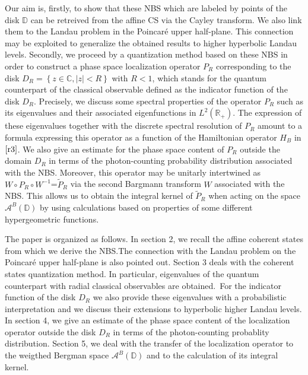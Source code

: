 Our aim is, firstly, to show that these NBS which are labeled by points of
the disk $\mathbb{D}$ can be retreived from the affine CS via the Cayley
transform. We also link them to the Landau problem in the Poincar\'{e} upper
half-plane. This connection may be exploited to generalize the obtained
results to higher hyperbolic Landau levels. Secondly, we proceed by a
quantization method based on these NBS in order to construct a phase space
localization operator $P_{R}$ corresponding to the disk $D_{R}=\left\{ z\in 
\mathbb{C},\left\vert z\right\vert <R\right\} $ with $R<1$, which stands for
the quantum counterpart of the classical observable defined as the indicator
function of the disk $D_{R}$. Precisely, we discuss some spectral properties
of the operator $P_{R}$ such as its eigenvalues and their associated
eigenfunctions in $L^{2}\left( \mathbb{R}_{+}\right) $. The expression of
these eigenvalues together with the discrete spectral resolution of $P_{R}$
amount to a formula expressing this operator as a function of the
Hamiltonian operator $H_{B}$ in $\eqref{r3} $. We also give an
estimate for the phase space content of $P_{R}$ outside the domain $D_{R}$
in terms of the photon-counting probability distribution associated with the
NBS. Moreover, this operator may be unitarly intertwined as $W\circ
P_{R}\circ W^{-1}$=$\widetilde{P}_{R}$ via the second Bargmann transform $W$
associated with the NBS. This allows us to obtain the integral kernel of $%
\widetilde{P}_{R}$ when acting on the space $\mathcal{A}^{B}\left( \mathbb{D}%
\right) $ by using calculations based on properties of some different
hypergeometric functions.

\smallskip

The paper is organized as follows. In section 2, we recall the affine
coherent states from which we derive the NBS.The connection with the Landau
problem on the Poincar\'{e} upper half-plane is also pointed out. Section 3
deals with the coherent states quantization method. In particular,
eigenvalues of the quantum counterpart with radial classical observables are
obtained.\ For the indicator function of the disk $D_{R}$ we also provide
these eigenvalues with a probabilistic interpretation and we discuss their
extensions to hyperbolic higher Landau levels. In section 4, we give an
estimate of the phase space content of the localization operator outside the
disk $D_{R}$ in terms of the photon-counting probablity distribution.
Section 5, we deal with the transfer of the localization operator to the
weigthed Bergman space $\mathcal{A}^{B}\left( \mathbb{D}\right) $ and to the
calculation of its integral kernel.










